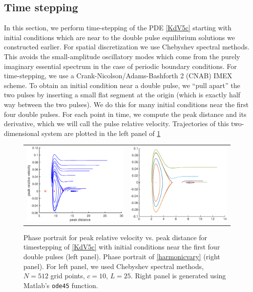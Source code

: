 \documentclass[thesis2.tex]{subfiles}
\begin{document}
\subsection{Time stepping}

In this section, we perform time-stepping of the PDE \eqref{KdV5c} starting with initial conditions which are near to the double pulse equilibrium solutions we constructed earlier. For spatial discretization we use Chebyshev spectral methods. This avoids the small-amplitude oscillatory modes which come from the purely imaginary essential spectrum in the case of periodic boundary conditions. For time-stepping, we use a Crank-Nicolson/Adams-Bashforth 2 (CNAB) IMEX scheme. To obtain an initial condition near a double pulse, we ``pull apart'' the two pulses by inserting a small flat segment at the origin (which is exactly half way between the two pulses). We do this for many initial conditions near the first four double pulses. For each point in time, we compute the peak distance and its derivative, which we will call the pulse relative velocity. Trajectories of this two-dimensional system are plotted in the left panel of \cref{fig:KdV5timestep}
\begin{figure}
\begin{center}
\begin{tabular}{cc}
\includegraphics[width=8cm]{images/kdv5numerics/phaseportrait} &
\includegraphics[width=8cm]{images/kdv5numerics/simplephaseportrait} \\
\end{tabular}
\caption[Phase portraits for timestepping of double pulses in KdV5]{Phase portrait for peak relative velocity vs. peak distance for timestepping of \cref{KdV5c} with initial conditions near the first four double pulses (left panel). Phase portrait of \cref{harmonicvary} (right panel). For left panel, we used Chebyshev spectral methods, $N = 512$ grid points, $c = 10$, $L = 25$. Right panel is generated using Matlab's \texttt{ode45} function.
}
\label{fig:KdV5timestep}
\end{center}
\end{figure}
\end{document}
